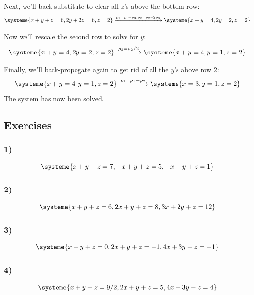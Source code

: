 \documentclass[a4paper,twoside,12pt]{memoir}  %
\begin{document}
Next, we'll back-substitute to clear all $z$'s above the bottom row:
\begin{equation*}
  \systeme{
     x + y + z = 6,
        2y + 2z = 6,
              z = 2
  }
  \xrightarrow{\rho_1 = \rho_1 -\rho_3; \rho_2 = \rho_2 - 2 \rho_3}
  \systeme{
     x + y      = 4,
        2y      = 2,
              z = 2
  }
\end{equation*}

Now we'll rescale the second row to solve for $y$:
\begin{equation*}
  \systeme{
     x + y      = 4,
        2y      = 2,
              z = 2
  }
  \xrightarrow{\rho_2 = \rho_2/2}
  \systeme{
     x + y      = 4,
         y      = 1,
              z = 2
  }
\end{equation*}

Finally, we'll back-propogate again to get rid of all the $y$'s above row 2:
\begin{equation*}
  \systeme{
     x + y      = 4,
         y      = 1,
              z = 2
  }
  \xrightarrow{\rho_1 = \rho_1 - \rho_2}
  \systeme{
     x          = 3,
         y      = 1,
              z = 2
  }
\end{equation*}
The system has now been solved.

\subsection{Exercises}
\subsubsection{1)}
\begin{equation*}
  \systeme{ %
     x + y + z = 7,
    -x + y + z = 5,
    -x - y + z = 1
  }
\end{equation*}

\subsubsection{2)}
\begin{equation*}
  \systeme{ %
     x + y + z = 6,
    2x + y + z = 8,
    3x + 2y + z = 12
  }
\end{equation*}

\subsubsection{3)}
\begin{equation*}
  \systeme{ %
     x +  y + z = 0,
    2x +  y + z = -1,
    4x + 3y - z = -1
  }
\end{equation*}

\subsubsection{4)}
\begin{equation*}
  \systeme{ %
     x +  y + z = 9/2,
    2x +  y + z = 5,
    4x + 3y - z = 4
  }
\end{equation*}
\end{document}
